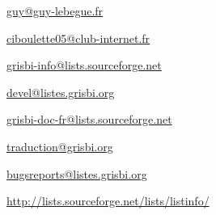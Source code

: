 \urldef{\urlGuyLebegueEmail}%
\url{guy@guy-lebegue.fr}     %

\urldef{\urlMicheleBondilEmail}%
\url{ciboulette05@club-internet.fr}     %

\urldef{\urlListInfoEmail}%
\url{grisbi-info@lists.sourceforge.net}     %

\urldef{\urlListDevelEmail}%
\url{devel@listes.grisbi.org}     %

\urldef{\urlListDocEmail}%
\url{grisbi-doc-fr@lists.sourceforge.net}     %

\urldef{\urlListTraductionEmail}%
\url{traduction@grisbi.org}  %

\urldef{\urlListBugsreport}%
\url{bugsreports@listes.grisbi.org}     %

\urldef{\urlListSF}%
\url{http://lists.sourceforge.net/lists/listinfo/}     %


